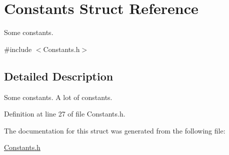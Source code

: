 \hypertarget{structConstants}{
\section{Constants Struct Reference}
\label{structConstants}
}


Some constants.  




{\ttfamily \#include $<$Constants.h$>$}



\subsection{Detailed Description}
Some constants. A lot of constants. 

Definition at line 27 of file Constants.h.



The documentation for this struct was generated from the following file:\begin{DoxyCompactItemize}
\item 
\hyperlink{Constants_8h}{Constants.h}\end{DoxyCompactItemize}
